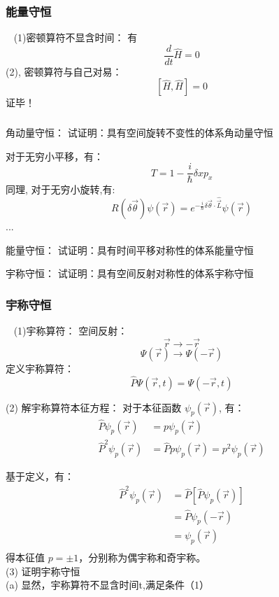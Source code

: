 \begin{frame} 
    \frametitle{能量守恒} 
    \例[25.试证明哈密顿算符不显含时间的体系能量守恒]{}                               
    \证~ (1)密顿算符不显含时间：
    有 $$\frac{d}{dt}\hat{H}=0$$ 
    (2), 密顿算符与自己对易： 
        $$ [\hat{H},\hat{H}]=0 $$
    证毕！
\end{frame}

\begin{frame} 
    \frametitle{} 
    \begin{atcbox}{角动量守恒：}
        试证明：具有空间旋转不变性的体系角动量守恒                               
    \end{atcbox}
    对于无穷小平移，有：
    $$T=1-\frac{i}{\hbar}\delta x p_x$$
    同理, 对于无穷小旋转,有:
    $$R(\delta \vec{\theta}) \psi(\vec{r})=e^{-\frac{i}{\hbar} \delta \vec{\theta} \cdot \widehat{\vec{L}}} \psi(\vec{r})
$$
...
\end{frame}

\begin{frame} 
    \begin{atcbox}{能量守恒：}
        试证明：具有时间平移对称性的体系能量守恒                               
    \end{atcbox}
    \begin{atcbox}{宇称守恒：}
        试证明：具有空间反射对称性的体系宇称守恒                             
    \end{atcbox}
\end{frame}

\begin{frame}
    \frametitle{宇称守恒} 
    \证~ (1)宇称算符：
    空间反射：$$\vec{r} \to -\vec{r} $$
    $$\Psi(\vec{r}) \to \Psi(-\vec{r}) $$
    定义宇称算符： $$ \hat{P}\Psi(\vec{r},t) = \Psi(-\vec{r},t) $$
    
    (2) 解宇称算符本征方程： 
    对于本征函数 $\psi_p (\vec{r})$, 有：
    $$\begin{aligned}
        \hat{P}\psi_p (\vec{r}) &= p\psi_p (\vec{r}) \\
        \hat{P}^2\psi_p (\vec{r}) &= \hat{P} p\psi_p (\vec{r}) = p^2\psi_p (\vec{r})
    \end{aligned}$$
\end{frame}

\begin{frame} 
    基于定义，有：
    $$\begin{aligned}
        \hat{P}^2\psi_p (\vec{r}) &= \hat{P} [\hat{P} \psi_p (\vec{r})]\\
        &= \hat{P} \psi_p (-\vec{r})\\
        &= \psi_p (\vec{r})\\
    \end{aligned}$$
    得本征值 $p=\pm 1$，分别称为偶宇称和奇宇称。\\ \vspace{0.6em}
    (3) 证明宇称守恒 \\
    (a) 显然，宇称算符不显含时间t,满足条件（1）\\

\end{frame}

